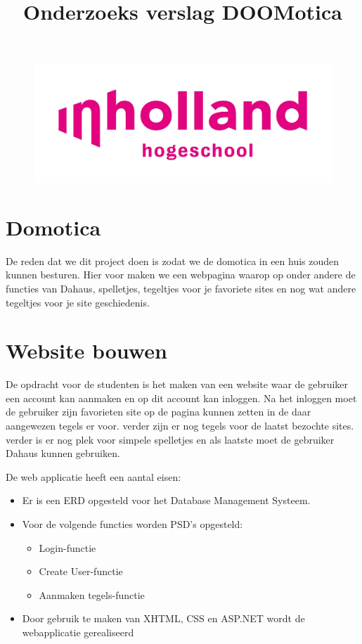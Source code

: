 \documentclass[11pt]{article}
\title{Onderzoeks verslag DOOMotica}
\begin{document}
	\maketitle %
	\begin{figure}[h]
		\centering
		\includegraphics[width=\textwidth]{inholland}
	\end{figure}
	
	\newpage
	
	\tableofcontents
	\newpage
	\section{Domotica}
	De reden dat we dit project doen is zodat we de domotica in een huis zouden kunnen besturen. Hier voor maken we een webpagina waarop op onder andere de functies van Dahaus, spelletjes, tegeltjes voor je favoriete sites en nog wat andere tegeltjes voor je site geschiedenis.
	\newline
	\newline
	\newline
	\newline
	\section{Website bouwen}
	
	De opdracht voor de studenten is het maken van een website waar de gebruiker een account kan aanmaken en op dit account kan inloggen. Na het inloggen moet de gebruiker zijn favorieten site op de pagina kunnen zetten in de daar aangewezen tegels er voor. verder zijn er nog tegels voor de laatst bezochte sites. verder is er nog plek voor simpele spelletjes en als laatste moet de gebruiker Dahaus kunnen gebruiken.
	
	De web applicatie heeft een aantal eisen:
	\begin{itemize}
		\item Er is een ERD opgesteld voor het Database Management Systeem.
		\item Voor de volgende functies worden PSD's opgesteld:
		\begin{itemize}
			\item Login-functie
			\item Create User-functie
			\item Aanmaken tegels-functie
		\end{itemize}
		\item Door gebruik te maken van XHTML, CSS en ASP.NET wordt de webapplicatie gerealiseerd
	\end{itemize}
	
\end{document}
